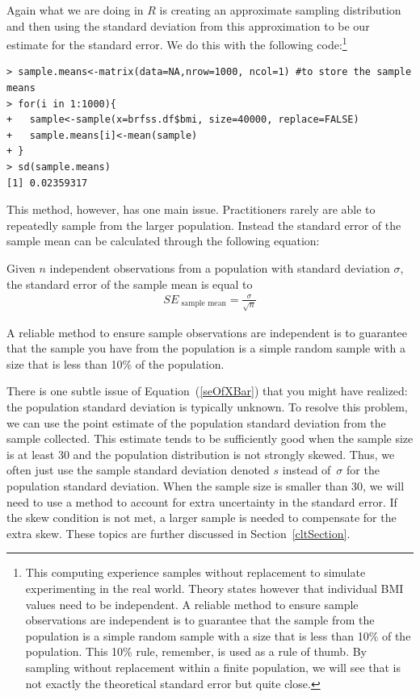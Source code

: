 Again what we are doing in $R$ is creating an approximate sampling distribution and then using the standard deviation from this approximation to be our estimate for the standard error. We do this with the following code:\footnote{This computing experience samples without replacement to simulate experimenting in the real world. Theory states however that individual BMI values need to be independent. A reliable method to ensure sample observations are independent is to guarantee that the sample from the population is a simple random sample with a size that is less than 10\% of the population. This 10\% rule, remember, is used as a rule of thumb. By sampling without replacement within a finite population, we will see that  is not exactly the theoretical standard error but quite close.}
\begin{verbatim}
> sample.means<-matrix(data=NA,nrow=1000, ncol=1) #to store the sample means
> for(i in 1:1000){
+   sample<-sample(x=brfss.df$bmi, size=40000, replace=FALSE)
+   sample.means[i]<-mean(sample)
+ }
> sd(sample.means)
[1] 0.02359317 
\end{verbatim}


This method, however, has one main issue. Practitioners rarely are able to repeatedly sample from the larger population. Instead the standard error of the sample mean can be calculated through the following equation: 

\begin{termBox}{
Given $n$ independent observations from a population with standard deviation $\sigma$, the standard error of the sample mean is equal to \vspace{-1mm}
\begin{eqnarray}
SE_{\text{ sample mean}} = \frac{\sigma}{\sqrt{n}}
\label{seOfXBar}
\end{eqnarray}\vspace{-3mm}%

A reliable method to ensure sample observations are independent is to guarantee that the sample you have from the population is a simple random sample with a size that is less than 10\% of the population.
}
\end{termBox}

There is one subtle issue of Equation~(\ref{seOfXBar}) that you might have realized: the population standard deviation is typically unknown. To resolve this problem, we can use the point estimate of the population standard deviation from the sample collected. This estimate tends to be sufficiently good when the sample size is at least 30 and the population distribution is not strongly skewed. Thus, we often just use the sample standard deviation denoted $s$ instead of~$\sigma$ for the population standard deviation. When the sample size is smaller than 30, we will need to use a method to account for extra uncertainty in the standard error. If the skew condition is not met, a larger sample is needed to compensate for the extra skew. These topics are further discussed in Section~\ref{cltSection}. 

